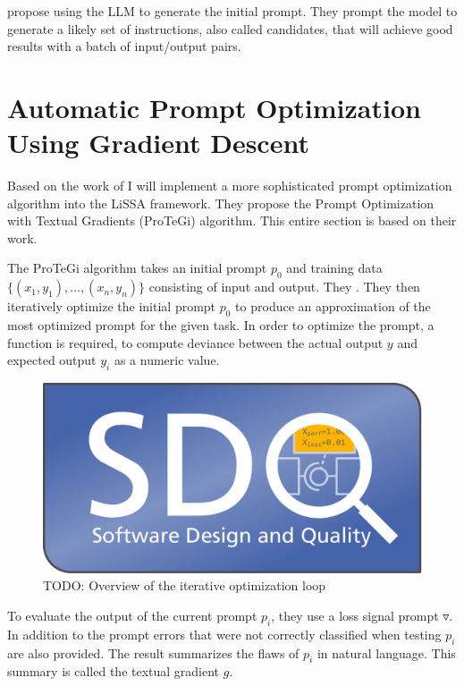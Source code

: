  propose using the LLM to generate the initial prompt. They prompt the model to generate a likely set of instructions, also called candidates, that will achieve good results with a batch of input/output pairs.




\section{Automatic Prompt Optimization Using Gradient Descent}
\label{sec:gradient_descent}
Based on the work of  I will implement a more sophisticated prompt optimization algorithm into the LiSSA framework. They propose the Prompt Optimization with Textual Gradients (ProTeGi) algorithm. This entire section is based on their work.

The ProTeGi algorithm takes an initial prompt $p_0$ and training data $\{(x_1, y_1), \dots, (x_n, y_n)\}$ consisting of input and output. They . They then iteratively optimize the initial prompt $p_0$ to produce an approximation of the most optimized prompt for the given task. In order to optimize the prompt, a function is required, to compute deviance between the actual output $y$ and expected output $y_i$ as a numeric value.

\begin{figure}[h]
\centering
\includegraphics[width=12cm]{logos/sdqlogo}
\caption{TODO: Overview of the iterative optimization loop}
\label{fig:sdqlogo}
\end{figure}

To evaluate the output of the current prompt $p_i$, they use a loss signal prompt $\triangledown$. In addition to the prompt errors that were not correctly classified when testing $p_i$ are also provided. The result summarizes the flaws of $p_i$ in natural language. This summary is called the textual gradient $g$.

